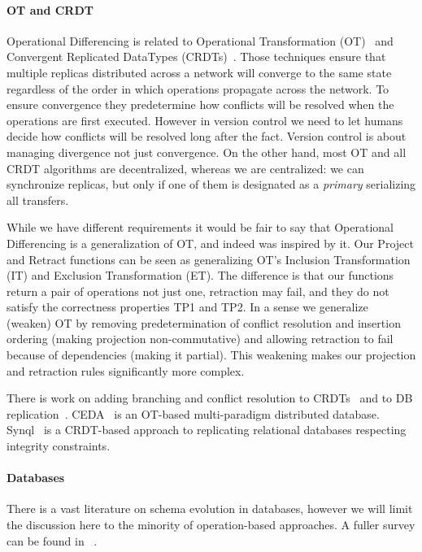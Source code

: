 \documentclass[english,submission]{programming}
\theoremstyle{definition}
\newcommand{\citet}[1]{\citeauthor*{#1}~\cite{#1}}
\begin{document}
\paragraph{OT and CRDT}

Operational Differencing is related to
Operational Transformation (OT)~\cite{ceda-ot, Ellis89, Ressel96, Oster06} and Convergent Replicated DataTypes (CRDTs)~\cite{Shapiro11}.
Those techniques ensure that multiple replicas distributed across a network will converge to the same state regardless of the order in which operations propagate across the network. To ensure convergence they predetermine how conflicts will be resolved when the operations are first executed. However in version control we need to let humans decide how conflicts will be resolved long after the fact. Version control is about managing divergence not just convergence. On the other hand, most OT and all CRDT algorithms are decentralized, whereas we are centralized: we can synchronize replicas, but only if one of them is designated as a \textit{primary} serializing all transfers.

While we have different requirements it would be fair to say that Operational Differencing is a generalization of OT, and indeed was inspired by it. Our Project and Retract functions can be seen as generalizing OT's Inclusion Transformation (IT) and Exclusion Transformation (ET). The difference is that our functions return a pair of operations not just one, retraction may fail, and they do not satisfy the correctness properties TP1 and TP2. In a sense we generalize (weaken) OT by removing predetermination of conflict resolution and insertion ordering (making projection non-commutative) and allowing retraction to fail because of dependencies (making it partial). This weakening makes our projection and retraction rules significantly more complex.

There is work on adding branching and conflict resolution to CRDTs~\cite{patchwork, automerge-conflicts} and to DB replication~\cite{couchdb-conflicts}.
CEDA~\cite{ceda} is an OT-based multi-paradigm distributed database.
Synql~\cite{ignat-synql} is a CRDT-based approach to replicating relational databases respecting integrity constraints.

\paragraph{Databases}

There is a vast literature on schema evolution in databases, however we will limit the discussion here to the minority of operation-based approaches. A fuller survey can be found in \citet{challenge-problems}.
\end{document}

